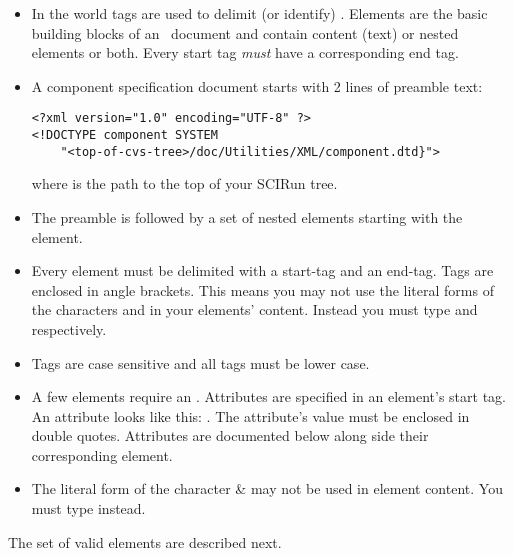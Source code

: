 \documentclass[11pt]{article}
\begin{document}
\begin{itemize}
\item In the \xml{} world tags are used to delimit (or identify)
  .  Elements are the basic building blocks of an \xml\
  document and contain content (text) or nested elements or both.
  Every start tag \emph{must} have a corresponding end tag.
  
\item A component specification document starts with 2 lines of preamble
  text:

\begin{verbatim}
<?xml version="1.0" encoding="UTF-8" ?>
<!DOCTYPE component SYSTEM 
    "<top-of-cvs-tree>/doc/Utilities/XML/component.dtd}">
\end{verbatim}

  where  is the path to the top of your
  SCIRun \cvs{} tree. 
  
\item The preamble is followed by a set of nested elements starting with
  the \element{component} element.
  
\item Every element must be delimited with a start-tag and an end-tag.
  Tags are enclosed in angle brackets.  This means you may not use
  the literal forms of the characters \keyboard{\la} and
  \keyboard{\ra} in your elements' content.  Instead you must type
  \keyboard{\&lt;} and \keyboard{\&gt;} respectively.

\item Tags are case sensitive and all tags must be lower case.
  
\item A few elements require an .  Attributes are specified
  in an element's start tag.  An attribute looks like this:
  .  The attribute's value
  must be enclosed in double quotes. Attributes are documented below
  along side their corresponding element.
  
\item The literal form of the character \& may not be used in element
  content.  You must type \keyboard{\&amp;} instead.

\end{itemize}

The set of valid elements are described next.

\subsection{\SUBSECstructContent}
\label{\SUBSECstructContent}
\end{document}

